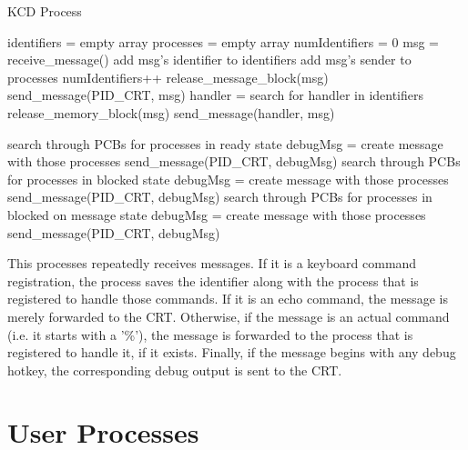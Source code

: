 \documentclass[12pt]{report}
\begin{document}
\begin{algorithm}[H]
	\caption{KCD Process}
	\begin{algorithmic}[1]
	    \State identifiers = empty array
	    \State processes = empty array
	    \State numIdentifiers = 0
	      \State msg = receive\_message()
	        \State add msg's identifier to identifiers
	        \State add msg's sender to processes
	        \State numIdentifiers++
	        \State release\_message\_block(msg)
	        \State send\_message(PID\_CRT, msg)
	      \Else
	          \State handler = search for handler in identifiers
	        \EndIf
	          \State release\_memory\_block(msg)
	        \Else
	          \State send\_message(handler, msg)
	        \EndIf

	          \State search through PCBs for processes in ready state
	          \State debugMsg = create message with those processes
	          \State send\_message(PID\_CRT, debugMsg)
	          \State search through PCBs for processes in blocked state
	          \State debugMsg = create message with those processes
	          \State send\_message(PID\_CRT, debugMsg)
	          \State search through PCBs for processes in blocked on message state
	          \State debugMsg = create message with those processes
	          \State send\_message(PID\_CRT, debugMsg)
	        \EndIf
	      \EndIf
	    \EndWhile
	  \EndFunction
	\end{algorithmic}
\end{algorithm}

This processes repeatedly receives messages. If it is a keyboard command registration, the process saves the identifier along with the process that is registered to handle those commands. If it is an echo command, the message is merely forwarded to the CRT. Otherwise, if the message is an actual command (i.e. it starts with a '\%'), the message is forwarded to the process that is registered to handle it, if it exists. Finally, if the message begins with any debug hotkey, the corresponding debug output is sent to the CRT.


\section{User Processes}
\end{document}
